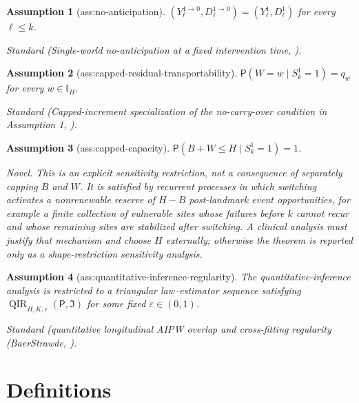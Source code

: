 \documentclass{article}
\newtheorem{assumption}{Assumption}
\begin{document}
\begin{assumption}[ass:no-anticipation]\label{ass:no-anticipation}
\((Y_{\ell}^{1\to0},D_{\ell}^{1\to0})=(Y_{\ell}^{1},D_{\ell}^{1})\) for every \(\ell\le k\).
\par\smallskip\noindent\emph{Standard} (Single-world no-anticipation at a fixed intervention time, \cite{RichardsonRobins2013}).
\end{assumption}

\begin{assumption}[ass:capped-residual-transportability]\label{ass:capped-residual-transportability}
\(\mathsf P(W=w\mid S_k^1=1)=q_w\) for every \(w\in\mathbb I_H\).
\par\smallskip\noindent\emph{Standard} (Capped-increment specialization of the no-carry-over condition in Assumption 1, \cite{JanvinRyalenSarvetStensrud2025}).
\end{assumption}

\begin{assumption}[ass:capped-capacity]\label{ass:capped-capacity}
\(\mathsf P(B+W\le H\mid S_k^1=1)=1\).
\par\smallskip\noindent\emph{Novel.} This is an explicit sensitivity restriction, not a consequence of separately capping \(B\) and \(W\). It is satisfied by recurrent processes in which switching activates a nonrenewable reserve of \(H-B\) post-landmark event opportunities, for example a finite collection of vulnerable sites whose failures before \(k\) cannot recur and whose remaining sites are stabilized after switching. A clinical analysis must justify that mechanism and choose \(H\) externally; otherwise the theorem is reported only as a shape-restriction sensitivity analysis.
\end{assumption}

\begin{assumption}[ass:quantitative-inference-regularity]\label{ass:quantitative-inference-regularity}
The quantitative-inference analysis is restricted to a triangular law--estimator sequence satisfying \(\operatorname{QIR}_{H,K,\varepsilon}(\mathsf P,\mathfrak I)\) for some fixed \(\varepsilon\in(0,1)\).
\par\smallskip\noindent\emph{Standard} (quantitative longitudinal AIPW overlap and cross-fitting regularity (BaerStrawde, \cite{BaerStrawdermanErtefaie2023}).
\end{assumption}

\section{Definitions}
\end{document}
